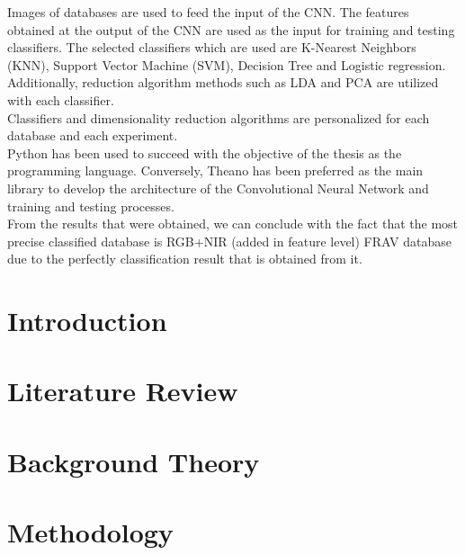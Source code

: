 \documentclass[12pt,a4paper,titlepage,twoside]{book}
\begin{document}
Images of databases are used to feed the input of the CNN. The features obtained at the output of the CNN are used as the input for training and testing classifiers. The selected classifiers which are used are K-Nearest Neighbors (KNN), Support Vector Machine (SVM), Decision Tree and Logistic regression. Additionally, reduction algorithm methods such as LDA and PCA are utilized with each classifier.\\

Classifiers and dimensionality reduction algorithms are personalized for each database and each experiment.\\

Python has been used to succeed with the objective of the thesis as the programming language. Conversely, Theano has been preferred as the main library to develop the architecture of the Convolutional Neural Network and training and testing processes.\\

From the results that were obtained, we can conclude with the fact that the most precise classified database is RGB+NIR (added in feature level) FRAV database due to the perfectly classification result that is obtained from it.






\tableofcontents %


\mainmatter
\chapter{Introduction}\label{ch:introduction}
  
\chapter{Literature Review}\label{ch:review}
	
\chapter{Background Theory}\label{theorics}
  
\chapter{Methodology} \label{ch:methodology}
  
\end{document}
